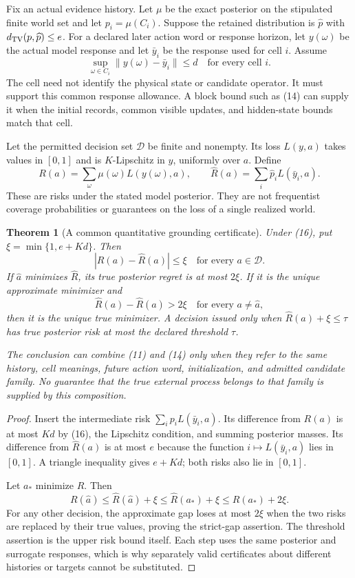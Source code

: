 \documentclass[11pt,letterpaper]{article}
\theoremstyle{plain}
\newtheorem{theorem}{Theorem}[section]
\theoremstyle{definition}
\begin{document}
Fix an actual evidence history. Let $\mu$ be the exact posterior on the stipulated finite world set and let $p_i=\mu(C_i)$. Suppose the retained distribution is $\widehat p$ with $d_{\mathrm{TV}}(p,\widehat p)\le e$. For a declared later action word or response horizon, let $y(\omega)$ be the actual model response and let $\bar y_i$ be the response used for cell $i$. Assume
\[
 \sup_{\omega\in C_i}\|y(\omega)-\bar y_i\|\le d
 \quad\text{for every cell }i. \tag{16}
\]
The cell need not identify the physical state or candidate operator. It must support this common response allowance. A block bound such as (14) can supply it when the initial records, common visible updates, and hidden-state bounds match that cell.

Let the permitted decision set $\mathcal D$ be finite and nonempty. Its loss $L(y,a)$ takes values in $[0,1]$ and is $K$-Lipschitz in $y$, uniformly over $a$. Define
\[
 R(a)=\sum_{\omega}\mu(\omega)L(y(\omega),a),\qquad
 \widehat R(a)=\sum_i\widehat p_iL(\bar y_i,a).
\]
These are risks under the stated model posterior. They are not frequentist coverage probabilities or guarantees on the loss of a single realized world.

\begin{theorem}[A common quantitative grounding certificate]\label{thm:jointrisk}
Under (16), put $\xi=\min\{1,e+Kd\}$. Then
\[
 |R(a)-\widehat R(a)|\le\xi\quad\text{for every }a\in\mathcal D.
\]
If $\widehat a$ minimizes $\widehat R$, its true posterior regret is at most $2\xi$. If it is the unique approximate minimizer and
\[
 \widehat R(a)-\widehat R(\widehat a)>2\xi\quad\text{for every }a\ne\widehat a,
\]
then it is the unique true minimizer. A decision issued only when $\widehat R(a)+\xi\le\tau$ has true posterior risk at most the declared threshold $\tau$.

The conclusion can combine (11) and (14) only when they refer to the same history, cell meanings, future action word, initialization, and admitted candidate family. No guarantee that the true external process belongs to that family is supplied by this composition.
\end{theorem}
\begin{proof}
Insert the intermediate risk $\sum_ip_iL(\bar y_i,a)$. Its difference from $R(a)$ is at most $Kd$ by (16), the Lipschitz condition, and summing posterior masses. Its difference from $\widehat R(a)$ is at most $e$ because the function $i\mapsto L(\bar y_i,a)$ lies in $[0,1]$. A triangle inequality gives $e+Kd$; both risks also lie in $[0,1]$.

Let $a_*$ minimize $R$. Then
\[
 R(\widehat a)\le\widehat R(\widehat a)+\xi
 \le\widehat R(a_*)+\xi\le R(a_*)+2\xi.
\]
For any other decision, the approximate gap loses at most $2\xi$ when the two risks are replaced by their true values, proving the strict-gap assertion. The threshold assertion is the upper risk bound itself. Each step uses the same posterior and surrogate responses, which is why separately valid certificates about different histories or targets cannot be substituted.
\end{proof}
\end{document}

